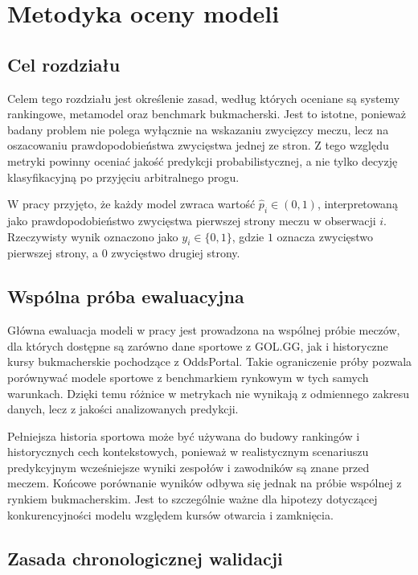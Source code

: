 \chapter{Metodyka oceny modeli}

\section{Cel rozdziału}

Celem tego rozdziału jest określenie zasad, według których oceniane są systemy rankingowe, metamodel
oraz benchmark bukmacherski. Jest to istotne, ponieważ badany problem nie polega wyłącznie na
wskazaniu zwycięzcy meczu, lecz na oszacowaniu prawdopodobieństwa zwycięstwa jednej ze stron. Z tego
względu metryki powinny oceniać jakość predykcji probabilistycznej, a nie tylko decyzję
klasyfikacyjną po przyjęciu arbitralnego progu.

W pracy przyjęto, że każdy model zwraca wartość \(\hat{p}_i \in (0,1)\), interpretowaną jako
prawdopodobieństwo zwycięstwa pierwszej strony meczu w obserwacji \(i\). Rzeczywisty wynik oznaczono
jako \(y_i \in \{0,1\}\), gdzie \(1\) oznacza zwycięstwo pierwszej strony, a \(0\) zwycięstwo
drugiej strony.

\section{Wspólna próba ewaluacyjna}

Główna ewaluacja modeli w pracy jest prowadzona na wspólnej próbie meczów, dla których dostępne są
zarówno dane sportowe z GOL.GG, jak i historyczne kursy bukmacherskie pochodzące z OddsPortal. Takie
ograniczenie próby pozwala porównywać modele sportowe z benchmarkiem rynkowym w tych samych
warunkach. Dzięki temu różnice w metrykach nie wynikają z odmiennego zakresu danych, lecz z jakości
analizowanych predykcji.

Pełniejsza historia sportowa może być używana do budowy rankingów i historycznych cech
kontekstowych, ponieważ w realistycznym scenariuszu predykcyjnym wcześniejsze wyniki zespołów i
zawodników są znane przed meczem. Końcowe porównanie wyników odbywa się jednak na próbie wspólnej z
rynkiem bukmacherskim. Jest to szczególnie ważne dla hipotezy dotyczącej konkurencyjności modelu
względem kursów otwarcia i zamknięcia.

\section{Zasada chronologicznej walidacji}

